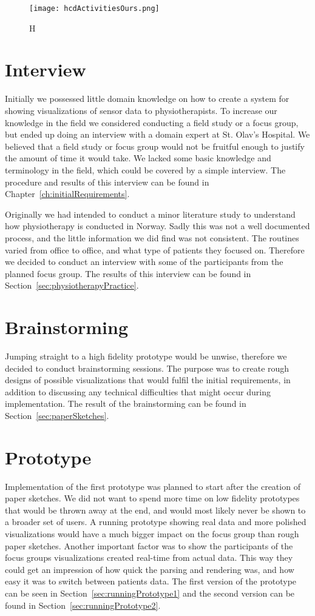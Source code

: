 \begin{figure}[h!]
	\centering
		\texttt{[image: hcdActivitiesOurs.png]}
		\caption{\footnotesize H}
		\label{fig:hcdActivitiesOurs}
\end{figure}

\section{Interview}
Initially we possessed little domain knowledge on how to create a system for showing visualizations of sensor data to physiotherapists. To increase our knowledge in the field we considered conducting a field study or a focus group, but ended up doing an interview with a domain expert at St. Olav's Hospital. We believed that a field study or focus group would not be fruitful enough to justify the amount of time it would take. We lacked some basic knowledge and terminology in the field, which could be covered by a simple interview. The procedure and results of this interview can be found in Chapter~\ref{ch:initialRequirements}. 

Originally we had intended to conduct a minor literature study to understand how physiotherapy is conducted in Norway. Sadly this was not a well documented process, and the little information we did find was not consistent. The routines varied from office to office, and what type of patients they focused on. Therefore we decided to conduct an interview with some of the participants from the planned focus group. The results of this interview can be found in Section~\ref{sec:physiotherapyPractice}.
 
\section{Brainstorming}
Jumping straight to a high fidelity prototype would be unwise, therefore we decided to conduct brainstorming sessions. The purpose was to create rough designs of possible visualizations that would fulfil the initial requirements, in addition to discussing any technical difficulties that might occur during implementation. The result of the brainstorming can be found in Section~\ref{sec:paperSketches}.

\section{Prototype}
Implementation of the first prototype was planned to start after the creation of paper sketches. We did not want to spend more time on low fidelity prototypes that would be thrown away at the end, and would most likely never be shown to a broader set of users. A running prototype showing real data and more polished visualizations would have a much bigger impact on the focus group than rough paper sketches. Another important factor was to show the participants of the focus groups visualizations created real-time from actual data. This way they could get an impression of how quick the parsing and rendering was, and how easy it was to switch between patients data. The first version of the prototype can be seen in Section~\ref{sec:runningPrototype1} and the second version can be found in Section~\ref{sec:runningPrototype2}.

